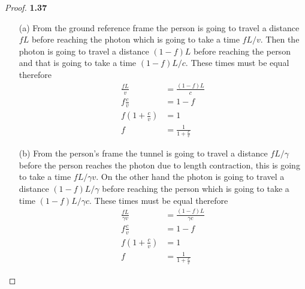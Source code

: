 \documentclass[11pt]{article}
\theoremstyle{definition}
\begin{document}
    \begin{proof}{\textbf{1.37}}
    \begin{itemize}
        \item [(a)] From the ground reference frame the person is going to
        travel a distance $fL$ before reaching the photon which is going to take
        a time $fL/v$. Then the photon is going to travel a distance $(1-f)L$
        before reaching the person and that is going to take a time $(1-f)L/c$.
        These times must be equal therefore
        \begin{align*}
            \frac{fL}{v} &= \frac{(1 - f)L}{c} \\
            f\frac{c}{v} &= 1 - f \\
            f\left(1 + \frac{c}{v}\right) &= 1 \\
            f &= \frac{1}{1 + \frac{c}{v}}
        \end{align*}
        \item [(b)] From the person's frame the tunnel is going to travel a
        distance $fL/\gamma$ before the person reaches the photon due to length
        contraction, this is going to take a time $fL/\gamma v$.
        On the other hand the photon is going to travel a distance
        $(1-f)L/\gamma$ before reaching the person which is going to take a
        time $(1-f)L/\gamma c$. These times must be equal therefore
        \begin{align*}
            \frac{fL}{\gamma v} &= \frac{(1 - f)L}{\gamma c} \\
            f\frac{c}{v} &= 1 - f \\
            f\left(1 + \frac{c}{v}\right) &= 1 \\
            f &= \frac{1}{1 + \frac{c}{v}}
        \end{align*}
    \end{itemize}        
    \end{proof}
\end{document}
